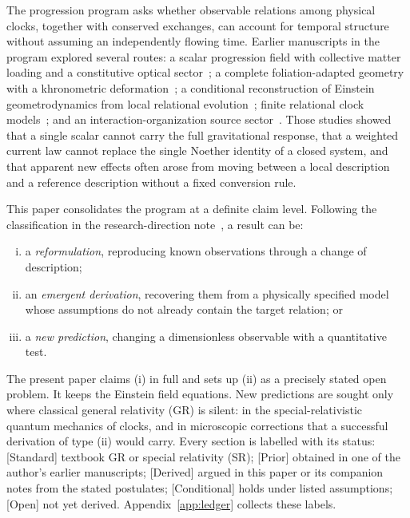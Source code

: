 \documentclass[11pt]{article}
\newcommand{\st}[1]{\textsf{\small[#1]}}
\theoremstyle{plain}
\theoremstyle{definition}
\theoremstyle{remark}
\begin{document}
The progression program asks whether observable relations among physical clocks, together with conserved exchanges, can account for temporal structure without assuming an independently flowing time. Earlier manuscripts in the program explored several routes: a scalar progression field with collective matter loading and a constitutive optical sector~\cite{JordanLoading,JordanOptics}; a complete foliation-adapted geometry with a khronometric deformation~\cite{JordanGeometry}; a conditional reconstruction of Einstein geometrodynamics from local relational evolution~\cite{JordanHDA}; finite relational clock models~\cite{JordanClocks}; and an interaction-organization source sector~\cite{JordanComplexity}. Those studies showed that a single scalar cannot carry the full gravitational response, that a weighted current law cannot replace the single Noether identity of a closed system, and that apparent new effects often arose from moving between a local description and a reference description without a fixed conversion rule.

This paper consolidates the program at a definite claim level. Following the classification in the research-direction note~\cite{JordanDirection}, a result can be:
\begin{enumerate}[(i)]
\item a \emph{reformulation}, reproducing known observations through a change of description;
\item an \emph{emergent derivation}, recovering them from a physically specified model whose assumptions do not already contain the target relation; or
\item a \emph{new prediction}, changing a dimensionless observable with a quantitative test.
\end{enumerate}
The present paper claims (i) in full and sets up (ii) as a precisely stated open problem. It keeps the Einstein field equations. New predictions are sought only where classical general relativity (GR) is silent: in the special-relativistic quantum mechanics of clocks, and in microscopic corrections that a successful derivation of type (ii) would carry. Every section is labelled with its status:
\st{Standard} textbook GR or special relativity (SR);
\st{Prior} obtained in one of the author's earlier manuscripts;
\st{Derived} argued in this paper or its companion notes from the stated postulates;
\st{Conditional} holds under listed assumptions;
\st{Open} not yet derived.
Appendix~\ref{app:ledger} collects these labels.

\end{document}
